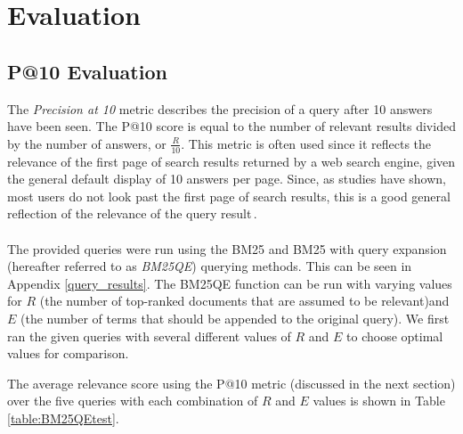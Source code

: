 \setlength{\tabcolsep}{15pt}
\section{Evaluation}
\label{sec:evaluation}
\subsection*{P@10 Evaluation}

The \textit{Precision at 10} metric describes the precision of a query after 10 answers have been seen. The P@10 score is equal to the number of relevant results divided by the number of answers, or $\frac{R}{10}$. This metric is often used since it reflects the relevance of the first page of search results returned by a web search engine, given the general default display of 10 answers per page. Since, as studies have shown, most users do not look past the first page of search results, this is a good general reflection of the relevance of the query result\,\cite{scholer13_6}.

\paragraph*{}

The provided queries were run using the BM25 and BM25 with query expansion (hereafter referred to as \textit{BM25QE}) querying methods. This can be seen in Appendix \ref{query_results}. The BM25QE function can be run with varying values for $R$ (the number of top-ranked documents that are assumed to be relevant)and $E$ (the number of terms that should be appended to the original query). We first ran the given queries with several different values of $R$ and $E$ to choose optimal values for comparison.

The average relevance score using the P@10 metric (discussed in the next section) over the five queries with each combination of $R$ and $E$ values is shown in Table \ref{table:BM25QEtest}.

\begin{centering}
\begin{table}
\caption {Average P@10 score for BM25QE with different combinations of R and E}\label{table:BM25QEtest}
\end{table}
\end{centering}

